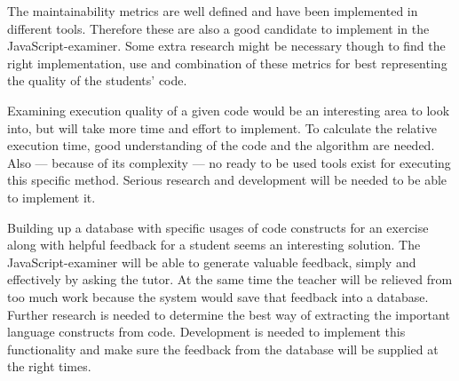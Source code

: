 The maintainability metrics are well defined and have been implemented in
different tools. Therefore these are also a good candidate to implement in
the JavaScript-examiner. Some extra research might be necessary though to find
the right implementation, use and combination of these metrics for best
representing the quality of the students' code.

Examining execution quality of a given code would be an interesting area to
look into, but will take more time and effort to implement. To calculate the
relative execution time, good understanding of the code and the algorithm are
needed. Also --- because of its complexity --- no ready to be used tools exist
for executing this specific method. Serious research and development will be
needed to be able to implement it.

Building up a database with specific usages of code constructs for an exercise
along with helpful feedback for a student seems an interesting solution. The
JavaScript-examiner will be able to generate valuable feedback, simply and
effectively by asking the tutor. At the same time the teacher will be relieved
from too much work because the system would save that feedback into a
database. Further research is needed to determine the best way of extracting
the important language constructs from code. Development is needed to implement
this functionality and make sure the feedback from the database will be
supplied at the right times.

